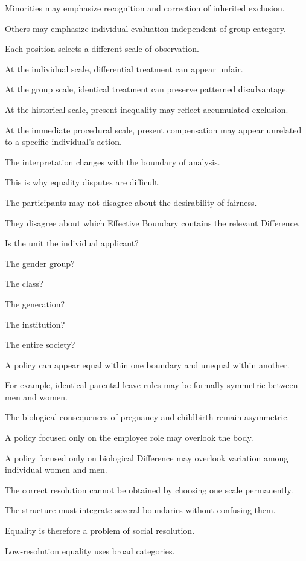 Minorities may emphasize recognition and correction of inherited exclusion.

Others may emphasize individual evaluation independent of group category.

Each position selects a different scale of observation.

At the individual scale, differential treatment can appear unfair.

At the group scale, identical treatment can preserve patterned disadvantage.

At the historical scale, present inequality may reflect accumulated exclusion.

At the immediate procedural scale, present compensation may appear unrelated to a specific individual’s action.

The interpretation changes with the boundary of analysis.

This is why equality disputes are difficult.

The participants may not disagree about the desirability of fairness.

They disagree about which Effective Boundary contains the relevant Difference.

Is the unit the individual applicant?

The gender group?

The class?

The generation?

The institution?

The entire society?

A policy can appear equal within one boundary and unequal within another.

For example, identical parental leave rules may be formally symmetric between men and women.

The biological consequences of pregnancy and childbirth remain asymmetric.

A policy focused only on the employee role may overlook the body.

A policy focused only on biological Difference may overlook variation among individual women and men.

The correct resolution cannot be obtained by choosing one scale permanently.

The structure must integrate several boundaries without confusing them.

Equality is therefore a problem of social resolution.

Low-resolution equality uses broad categories.

